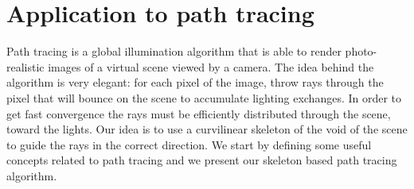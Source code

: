 \section{Application to path tracing}
\label{sec::appli_pathtrace}

Path tracing is a global illumination algorithm that is able to render photo-realistic images of a virtual scene viewed by a camera. The idea behind the algorithm is very elegant: for each pixel of the image, throw rays through the pixel that will bounce on the scene to accumulate lighting exchanges. In order to get fast convergence the rays must be efficiently distributed through the scene, toward the lights. Our idea is to use a curvilinear skeleton of the void of the scene to guide the rays in the correct direction. We start by defining some useful concepts related to path tracing and we present our skeleton based path tracing algorithm.

